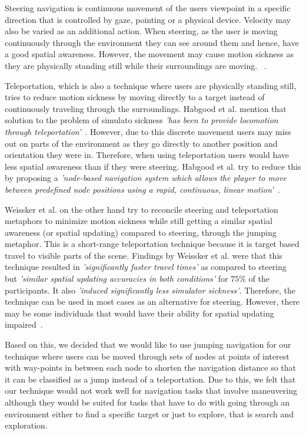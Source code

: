 Steering navigation is continuous movement of the users viewpoint in a specific direction that is controlled by gaze, pointing or a physical device. Velocity may also be varied as an additional action. When steering, as the user is moving continuously through the environment they can see around them and hence, have a good spatial awareness. However, the movement may cause motion sickness as they are physically standing still while their surroundings are moving. ~\cite{Habgood2018}.

Teleportation, which is also a technique where users are physically standing still, tries to reduce motion sickness by moving directly to a target instead of continuously traveling through the surroundings. Habgood et al. mention that solution to the problem of simulato sickness \textit{'has been to provide locomotion through teleportation'}~\cite{Habgood2018}. However, due to this discrete movement users may miss out on parts of the environment as they go directly to another position and orientation they were in. Therefore, when using teleportation users would have less spatial awareness than if they were steering. Habgood et al. try to reduce this by proposing a \textit{'node-based navigation system which allows the player to move between predefined node positions using a rapid, continuous, linear motion'}~\cite{Habgood2018}.

Weissker et al. on the other hand try to reconcile steering and teleportation metaphors to minimize motion sickness while still getting a similar spatial awareness (or spatial updating) compared to steering, through the jumping metaphor. This is a short-range teleportation technique because it is target based travel to visible parts of the scene. Findings by Weissker et al. were that this technique resulted in \textit{'significantly faster travel times'} as compared to steering but \textit{'similar spatial updating accuracies in both conditions'} for $75\%$ of the participants. It also \textit{'induced significantly less simulator sickness'}. Therefore, the technique can be used in most cases as an alternative for steering. However, there may be some individuals that would have their ability for spatial updating impaired~\cite{Weissker2018}.

Based on this, we decided that we would like to use jumping navigation for our technique where users can be moved through sets of nodes at points of interest with way-points in between each node to shorten the navigation distance so that it can be classified as a jump instead of a teleportation. Due to this, we felt that our technique would not work well for navigation tasks that involve maneuvering although they would be suited for tasks that have to do with going through an environment either to find a specific target or just to explore, that is search and exploration. 

